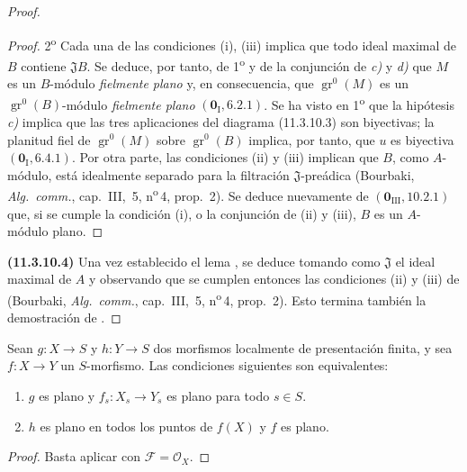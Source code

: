 \begin{proof}
\begin{proof}
2\textsuperscript{o} Cada una de las condiciones (i), (iii) implica que todo ideal maximal de $B$ contiene $\mathfrak JB$. Se deduce, por tanto, de 1\textsuperscript{o} y de la conjunción de \emph{c)} y \emph{d)} que $M$ es un $B$-módulo \emph{fielmente plano} y, en consecuencia, que $\operatorname{gr}^0(M)$ es un $\operatorname{gr}^0(B)$-módulo \emph{fielmente plano} $(\mathbf 0_{\mathrm I},6.2.1)$. Se ha visto en 1\textsuperscript{o} que la hipótesis \emph{c)} implica que las tres aplicaciones del diagrama \textup{(11.3.10.3)} son biyectivas; la planitud fiel de $\operatorname{gr}^0(M)$ sobre $\operatorname{gr}^0(B)$ implica, por tanto, que $u$ es biyectiva $(\mathbf 0_{\mathrm I},6.4.1)$. Por otra parte, las condiciones (ii) y (iii) implican que $B$, como $A$-módulo, está idealmente separado para la filtración $\mathfrak J$-preádica (Bourbaki, \emph{Alg.\ comm.}, cap.~III, \textsection\,5, n\textsuperscript{o}\,4, prop.~2). Se deduce nuevamente de $(\mathbf 0_{\mathrm{III}},10.2.1)$ que, si se cumple la condición (i), o la conjunción de (ii) y (iii), $B$ es un $A$-módulo plano.
\end{proof}

\label{IV.11.3.10.4}
\textbf{(11.3.10.4)} Una vez establecido el lema , se deduce  tomando como $\mathfrak J$ el ideal maximal de $A$ y observando que se cumplen entonces las condiciones (ii) y (iii) de  (Bourbaki, \emph{Alg.\ comm.}, cap.~III, \textsection\,5, n\textsuperscript{o}\,4, prop.~2). Esto termina también la demostración de .
\end{proof}

\begin{corollary}[11.3.11]
\label{IV.11.3.11}
Sean $g:X\to S$ y $h:Y\to S$ dos morfismos localmente de presentación finita, y sea $f:X\to Y$ un $S$-morfismo. Las condiciones siguientes son equivalentes:
\begin{enumerate}[label=\emph{\alph*)}]
  \item $g$ es plano y $f_s:X_s\to Y_s$ es plano para todo $s\in S$.
  \item $h$ es plano en todos los puntos de $f(X)$ y $f$ es plano.
\end{enumerate}
\end{corollary}

\begin{proof}
Basta aplicar  con $\mathcal F=\mathcal O_X$.
\end{proof}


